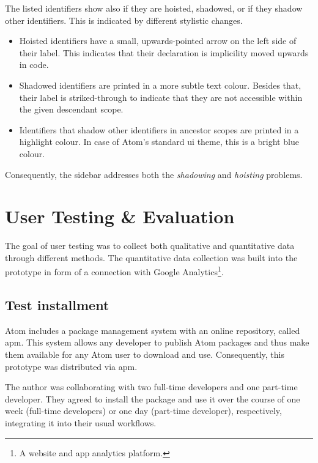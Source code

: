The listed identifiers show also if they are hoisted, shadowed, or if
they shadow other identifiers. This is indicated by different stylistic
changes.

\begin{itemize}
\itemsep1pt\parskip0pt
\item
  Hoisted identifiers have a small, upwards-pointed arrow on the left
  side of their label. This indicates that their declaration is
  implicility moved upwards in code.
\item
  Shadowed identifiers are printed in a more subtle text colour. Besides
  that, their label is striked-through to indicate that they are not
  accessible within the given descendant scope.
\item
  Identifiers that shadow other identifiers in ancestor scopes are
  printed in a highlight colour. In case of Atom’s standard \ac{ui}
  theme, this is a bright blue colour.
\end{itemize}

Consequently, the sidebar addresses both the \emph{shadowing} and
\emph{hoisting} problems.

\section{User Testing \& Evaluation}\label{user-testing-evaluation}

The goal of user testing was to collect both qualitative and
quantitative data through different methods. The quantitative data
collection was built into the prototype in form of a connection with
Google Analytics\footnote{A website and app analytics platform.}.

\subsection{Test installment}\label{test-installment}

Atom includes a package management system with an online repository,
called \ac{apm}. This system allows any developer to publish Atom
packages and thus make them available for any Atom user to download and
use. Consequently, this prototype was distributed via \ac{apm}.

The author was collaborating with two full-time developers and one
part-time developer. They agreed to install the package and use it over
the course of one week (full-time developers) or one day (part-time
developer), respectively, integrating it into their usual workflows.

